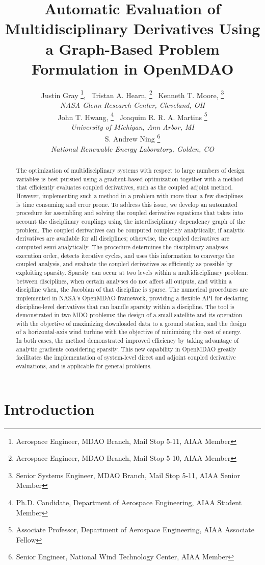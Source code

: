 \documentclass[]{aiaa-tc} %
\title{Automatic Evaluation of Multidisciplinary Derivatives Using a Graph-Based Problem Formulation in OpenMDAO}
\author{
  Justin Gray%
     \thanks{Aerospace Engineer, MDAO Branch, Mail Stop 5-11, AIAA Member},
  \ Tristan A. Hearn,%
     \thanks{Aerospace Engineer, MDAO Branch, Mail Stop 5-10, AIAA Member}
  \ Kenneth T. Moore,%
     \thanks{Senior Systems Engineer, MDAO Branch, Mail Stop 5-11, AIAA Senior Member}
   \\
  {\normalsize\itshape
  NASA Glenn Research Center, Cleveland, OH}  \\
  John T. Hwang,%
  \thanks{Ph.D. Candidate, Department of Aerospace Engineering, AIAA Student Member}
  \ Joaquim R. R. A. Martins%
  \thanks{Associate Professor, Department of Aerospace Engineering, AIAA Associate Fellow}
  \\
  {\normalsize\itshape
   University of Michigan, Ann Arbor, MI}\\
  S. Andrew Ning
    \thanks{Senior Engineer, National Wind Technology Center, AIAA Member}
  \\
  {\normalsize\itshape
   National Renewable Energy Laboratory, Golden, CO}
}
\begin{document}
  \maketitle

  \begin{abstract}
The optimization of multidisciplinary systems with respect to large numbers of design variables is best pursued using a gradient-based optimization together with a method that efficiently evaluates coupled derivatives, such as the coupled adjoint method. However, implementing such a method in a problem with more than a few disciplines is time consuming and error prone. To address this issue, we develop an automated procedure for assembling and solving the coupled derivative equations that takes into account the disciplinary couplings using the interdisciplinary dependency graph of the problem. The coupled derivatives can be computed completely analytically, if analytic derivatives are available for all disciplines; otherwise, the coupled derivatives are computed semi-analytically. The procedure determines the disciplinary analyses execution order, detects iterative cycles, and uses this information to converge the coupled analysis, and evaluate the coupled derivatives as efficiently as possible by exploiting sparsity. Sparsity can occur at two levels within a multidisciplinary problem: between disciplines, when certain analyses do not affect all outputs, and within a discipline when, the Jacobian of that discipline is sparse. The numerical procedures are implemented in NASA's OpenMDAO framework, providing a flexible API for declaring discipline-level derivatives that can handle sparsity within a discipline.  The tool is demonstrated in two MDO problems: the design of a small satellite and its operation with the objective of maximizing downloaded data to a ground station, and the design of a horizontal-axis wind turbine with the objective of minimizing the cost of energy. In both cases, the method demonstrated improved efficiency by taking advantage of analytic gradients considering sparsity. This new capability in OpenMDAO greatly facilitates the implementation of system-level direct and adjoint coupled derivative evaluations, and is applicable for general problems.
  \end{abstract}

  \section{Introduction}
\end{document}
